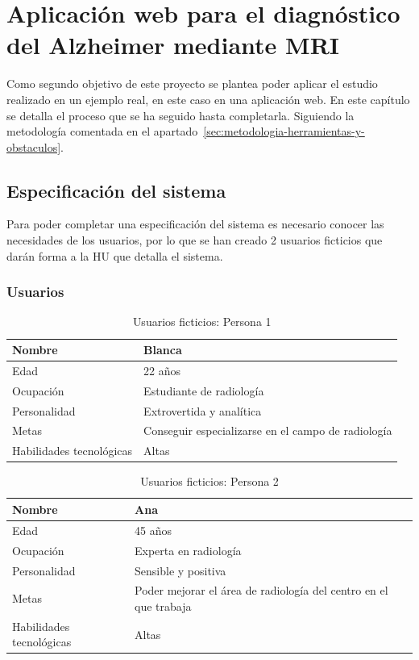 \chapter{Aplicación web para el diagnóstico del Alzheimer mediante MRI}
\label{ch:aplicacion-web-para-el-diagnostico-del-alzheimer-mediante-mri}
Como segundo objetivo de este proyecto se plantea poder aplicar el estudio realizado en un ejemplo real, en este caso
en una aplicación web.
En este capítulo se detalla el proceso que se ha seguido hasta completarla.
Siguiendo la metodología comentada en el apartado~\ref{sec:metodologia-herramientas-y-obstaculos}.

\section{Especificación del sistema}\label{sec:especificacion-del-sistema}
Para poder completar una especificación del sistema es necesario conocer las necesidades de los usuarios, por lo que se
han creado 2 usuarios ficticios que darán forma a la HU que detalla el sistema.

\subsection{Usuarios}\label{subsec:usuarios}
\begin{table}[H]
    \centering
    \begin{tabular}{| l | l|}
        \hline
        Nombre & Blanca \\
        \hline
        Edad & 22 años \\
        \hline
        Ocupación & Estudiante de radiología \\
        \hline
        Personalidad & Extrovertida y analítica \\
        \hline
        Metas & Conseguir especializarse en el campo de radiología \\
        \hline
        Habilidades tecnológicas & Altas \\
        \hline
    \end{tabular}
    \caption{Usuarios ficticios: Persona 1}
    \label{tab:persona1}
\end{table}

\begin{table}[H]
    \centering
    \begin{tabular}{| l | l|}
        \hline
        Nombre & Ana \\
        \hline
        Edad & 45 años \\
        \hline
        Ocupación & Experta en radiología \\
        \hline
        Personalidad & Sensible y positiva \\
        \hline
        Metas & Poder mejorar el área de radiología del centro en el que trabaja \\
        \hline
        Habilidades tecnológicas & Altas \\
        \hline
    \end{tabular}
    \caption{Usuarios ficticios: Persona 2}
    \label{tab:persona2}
\end{table}


